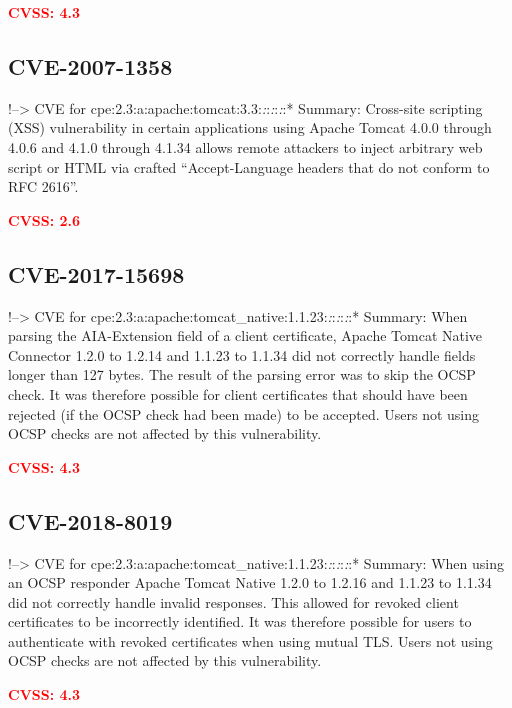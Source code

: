 \documentclass[a4paper, 12pt]{article}
\begin{document}
\textbf{\textcolor{red}{CVSS: 4.3}}

\hypertarget{cve-2007-1358}{%
\subsection{CVE-2007-1358}\label{cve-2007-1358}}

!--\textgreater{} CVE for
cpe:2.3:a:apache:tomcat:3.3:\emph{:}:\emph{:}:\emph{:}:* Summary:
Cross-site scripting (XSS) vulnerability in certain applications using
Apache Tomcat 4.0.0 through 4.0.6 and 4.1.0 through 4.1.34 allows remote
attackers to inject arbitrary web script or HTML via crafted
``Accept-Language headers that do not conform to RFC 2616''.

\textbf{\textcolor{red}{CVSS: 2.6}}

\hypertarget{cve-2017-15698}{%
\subsection{CVE-2017-15698}\label{cve-2017-15698}}

!--\textgreater{} CVE for
cpe:2.3:a:apache:tomcat\_native:1.1.23:\emph{:}:\emph{:}:\emph{:}:*
Summary: When parsing the AIA-Extension field of a client certificate,
Apache Tomcat Native Connector 1.2.0 to 1.2.14 and 1.1.23 to 1.1.34 did
not correctly handle fields longer than 127 bytes. The result of the
parsing error was to skip the OCSP check. It was therefore possible for
client certificates that should have been rejected (if the OCSP check
had been made) to be accepted. Users not using OCSP checks are not
affected by this vulnerability.

\textbf{\textcolor{red}{CVSS: 4.3}}

\hypertarget{cve-2018-8019}{%
\subsection{CVE-2018-8019}\label{cve-2018-8019}}

!--\textgreater{} CVE for
cpe:2.3:a:apache:tomcat\_native:1.1.23:\emph{:}:\emph{:}:\emph{:}:*
Summary: When using an OCSP responder Apache Tomcat Native 1.2.0 to
1.2.16 and 1.1.23 to 1.1.34 did not correctly handle invalid responses.
This allowed for revoked client certificates to be incorrectly
identified. It was therefore possible for users to authenticate with
revoked certificates when using mutual TLS. Users not using OCSP checks
are not affected by this vulnerability.

\textbf{\textcolor{red}{CVSS: 4.3}}
\end{document}
